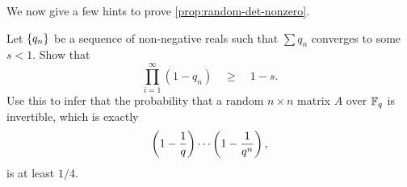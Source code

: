 We now give a few hints to prove \autoref{prop:random-det-nonzero}. 


\begin{exercise}
  Let $\left\{q_n\right\}$ be a sequence of non-negative reals such that $\sum q_n$ converges to some $s < 1$. Show that 
  \[
  \prod_{i=1}^{\infty} (1 - q_n) \quad \geq \quad 1 - s. 
  \]
  Use this to infer that the probability that a random $n\times n$ matrix $A$ over $\mathbb{F}_q$ is invertible, which is exactly
  \[
  \left(1 - \frac{1}{q}\right)\cdots \left(1 - \frac{1}{q^{n}}\right),
  \]
  is at least $1/4$. 

\end{exercise}


